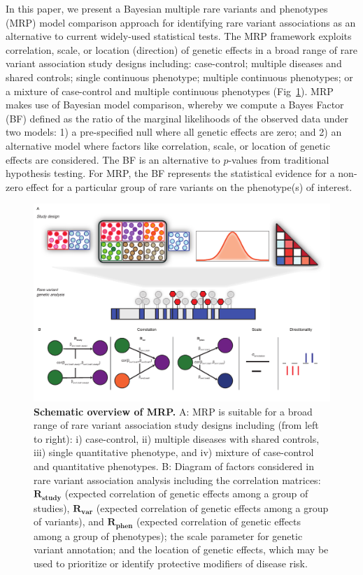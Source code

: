 In this paper, we present a Bayesian multiple rare variants and phenotypes (MRP) model comparison approach for identifying rare variant associations as an alternative to current widely-used statistical tests. The MRP framework exploits correlation, scale, or location (direction) of genetic effects in a broad range of rare variant association study designs including: case-control; multiple diseases and shared controls; single continuous phenotype; multiple continuous phenotypes; or a mixture of case-control and multiple continuous phenotypes (Fig~\ref{overview}). MRP makes use of Bayesian model comparison, whereby we compute a Bayes Factor (BF) defined as the ratio of the marginal likelihoods of the observed data under two models: 1) a pre-specified null where all genetic effects are zero; and 2) an alternative model where factors like correlation, scale, or location of genetic effects are considered. The BF is an alternative to $p$-values from traditional hypothesis testing. For MRP, the BF represents the statistical evidence for a non-zero effect for a particular group of rare variants on the phenotype(s) of interest.

\begin{figure}[!h]
\includegraphics[width=\textwidth]{../figures/Figure_01.pdf}
\caption{{\bf Schematic overview of MRP.}
A: MRP is suitable for a broad range of rare variant association study designs including (from left to right): i) case-control, ii) multiple diseases with shared controls, iii) single quantitative phenotype, and iv) mixture of case-control and quantitative phenotypes. B: Diagram of factors considered in rare variant association analysis including the correlation matrices: $\mathbf{R_{\textrm{study}}}$  (expected correlation of genetic effects among a group of studies), $\mathbf{R_{\textrm{var}}}$ (expected correlation of genetic effects among a group of variants), and $\mathbf{R_{\textrm{phen}}}$ (expected correlation of genetic effects among a group of phenotypes); the scale parameter for genetic variant annotation; and the location of genetic effects, which may be used to prioritize or identify protective modifiers of disease risk.}
\label{overview}
\end{figure}


